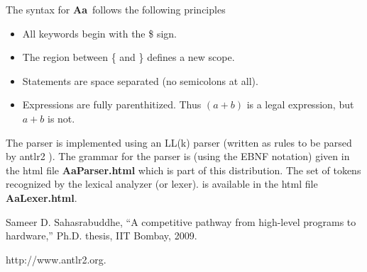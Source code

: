 \documentclass{article}
\newcommand{\Aa}{{\bf Aa}~}
\begin{document}
The syntax for \Aa follows the following
principles
\begin{itemize}
\item All keywords begin with the \$ sign.
\item The region between \{ and \} defines a new scope.
\item Statements are space separated (no semicolons at all).
\item Expressions are fully parenthitized.  Thus
$(a + b)$ is a legal expression, but $a+b$ is not.
\end{itemize}

The parser is implemented using 
an LL(k) parser (written as rules to be parsed by antlr2 \cite{ref:antlr2}).
The grammar for the parser is (using the EBNF notation) given in 
the html file {\bf AaParser.html} which is part of this distribution. 
The set of tokens recognized by the lexical analyzer (or lexer).
is available in the html file {\bf AaLexer.html}.

\begin{thebibliography}{99}
Sameer D. Sahasrabuddhe,
``A competitive pathway from high-level programs to hardware,''
Ph.D. thesis, IIT Bombay, 2009.

http://www.antlr2.org.
\end{thebibliography}
\end{document}
